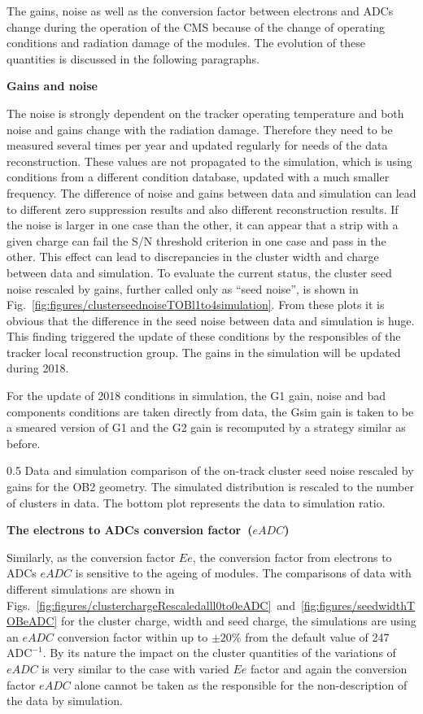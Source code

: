 The gains, noise as well as the conversion factor between electrons and ADCs change during the operation of the CMS because of the change of operating conditions and radiation damage of the modules. The evolution of these quantities is discussed in the following paragraphs.   
 
\textbf{Gains and noise}

The noise is strongly dependent on the tracker operating temperature and both noise and gains change with the radiation damage. Therefore they need to be measured several times per year and updated regularly for needs of the data reconstruction. These values are not propagated to the simulation, which is using conditions from a different condition database, updated with a much smaller frequency. The difference of noise and gains between data and simulation can lead to different zero suppression results and also different reconstruction results. If the noise is larger in one case than the other, it can appear that a strip with a given charge can fail the S/N threshold criterion in one case and pass in the other. This effect can lead to discrepancies in the cluster width and charge between data and simulation. To evaluate the current status, the cluster seed noise rescaled by gains, further called only as ``seed noise'', is shown in Fig.~\ref{fig:figures/clusterseednoiseTOBl1to4simulation}. From these plots it is obvious that the difference in the seed noise between data and simulation is huge. This finding triggered the update of these conditions by the responsibles of the tracker local reconstruction group. The gains in the simulation will be updated during 2018.

For the update of 2018 conditions in simulation, the G1 gain, noise and bad components conditions are taken directly from data, the Gsim gain is taken to be a smeared version of G1 and the G2 gain is recomputed by a strategy similar as before.

                 {0.5}       %
                 { Data and simulation comparison of the on-track cluster seed noise rescaled by gains for the OB2 geometry. The simulated distribution is rescaled to the number of clusters in data. The bottom plot represents the data to simulation ratio. }


\textbf{The electrons to ADCs conversion factor~($eADC$)}

Similarly, as the conversion factor $Ee$, the conversion factor from electrons to ADCs $eADC$ is sensitive to the ageing of modules. The comparisons of data with different simulations are shown in Figs.~\ref{fig:figures/clusterchargeRescaledalll0to0eADC}~and~\ref{fig:figures/seedwidthTOBeADC} for the cluster charge, width and seed charge, the simulations are using an $eADC$ conversion factor within up to $\pm 20\%$ from the default value of 247~$\mathrm{ADC^{-1}}$. By its nature the impact on the cluster quantities of the variations of $eADC$ is very similar to the case with varied $Ee$ factor and again the conversion factor $eADC$ alone cannot be taken as the responsible for the non-description of the data by simulation. 


